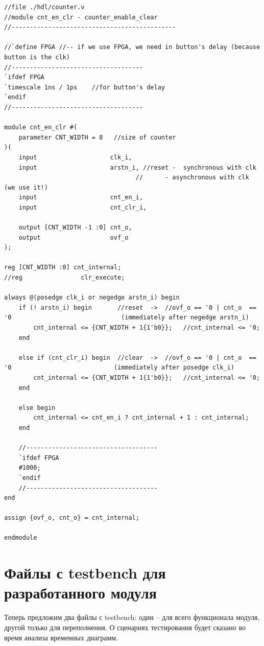 \documentclass[12pt, a4paper]{article}
\begin{document}
\begin{lstlisting}[caption={Содержимое файла ./hdl/counter.v}, label={lst:example}]
//file ./hdl/counter.v
//module cnt_en_clr - counter_enable_clear 
//---------------------------------------------

//`define FPGA //-- if we use FPGA, we need in button's delay (because button is the clk)
//------------------------------------
`ifdef FPGA
`timescale 1ns / 1ps    //for button's delay
`endif
//------------------------------------

module cnt_en_clr #(
	parameter CNT_WIDTH = 8   //size of counter
)(
	input                    clk_i,
	input                    arstn_i, //reset -  synchronous with clk
                                    //      - asynchronous with clk (we use it!)
	input                    cnt_en_i,
	input                    cnt_clr_i,

	output [CNT_WIDTH -1 :0] cnt_o,
	output                   ovf_o 
);

reg [CNT_WIDTH :0] cnt_internal;
//reg                clr_execute;

always @(posedge clk_i or negedge arstn_i) begin
	if (! arstn_i) begin       //reset  ->  //ovf_o == '0 | cnt_o  == '0                              (immediately after negedge arstn_i)  
		cnt_internal <= {CNT_WIDTH + 1{1'b0}};   //cnt_internal <= '0;
	end 

	else if (cnt_clr_i) begin  //clear  ->  //ovf_o == '0 | cnt_o  == '0  	                        (immediately after posedge clk_i)  
		cnt_internal <= {CNT_WIDTH + 1{1'b0}};   //cnt_internal <= '0;
	end

	else begin
		cnt_internal <= cnt_en_i ? cnt_internal + 1 : cnt_internal; 
	end

	//------------------------------------
	`ifdef FPGA 
	#1000;
	`endif
	//------------------------------------
end

assign {ovf_o, cnt_o} = cnt_internal;

endmodule

\end{lstlisting}

	\section{Файлы с testbench для разработанного модуля}

Теперь предложим два файлы с testbench: один -- для всего функционала модуля, другой только для переполнения. О сценариях тестирования будет сказано во время анализа временных диаграмм.
\end{document}
